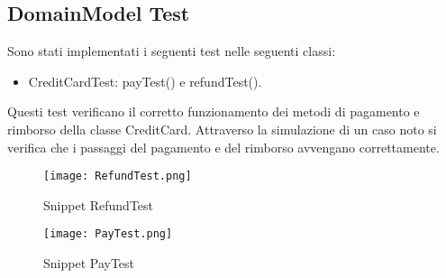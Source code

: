 \documentclass{article}
\begin{document}
\subsection{DomainModel Test}
Sono stati implementati i seguenti test nelle seguenti classi:
\begin{itemize}
    \item CreditCardTest: payTest() e refundTest().
\end{itemize}
Questi test verificano il corretto funzionamento dei metodi di pagamento e rimborso della classe CreditCard. Attraverso la simulazione di un caso noto si
verifica che i passaggi del pagamento e del rimborso avvengano correttamente.
\begin{figure}[h!]
    \centering
    \texttt{[image: RefundTest.png]}
    \caption{Snippet RefundTest}
    \label{fig:RefundTest}
\end{figure}
\begin{figure}
     \centering
    \texttt{[image: PayTest.png]}
    \caption{Snippet PayTest}
    \label{fig:PayTest}
\end{figure}
\end{document}

